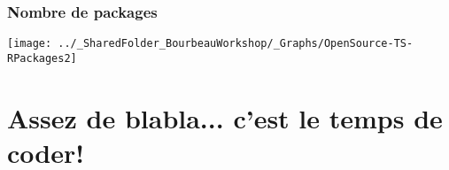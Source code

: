 \documentclass{beamer}
\begin{document}
    \begin{frame}
        \frametitle{Nombre de packages \R}  \vspace{1.2cm}
        \begin{center}
            \texttt{[image: ../\_SharedFolder\_BourbeauWorkshop/\_Graphs/OpenSource-TS-RPackages2]}
        \end{center} 
    \end{frame}
   
\section{Assez de blabla... c'est le temps de coder!} 
  
% 
% 
%     
%   
% 
%   
%     
\end{document}
